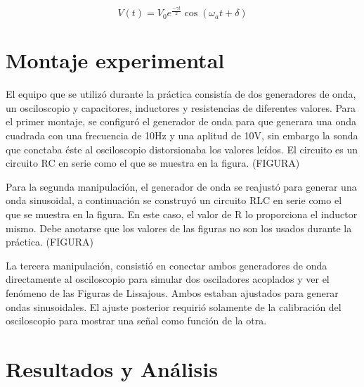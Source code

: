 \documentclass[%
 reprint,
 amsmath,amssymb,
 aps,
]{revtex4-1}
\begin{document}
\begin{equation}
V(t) = V_0 e^{\frac{-\gamma t}{2}}\cos(\omega_a t + \delta)
\end{equation}






\section{\label{sec:level1}Montaje experimental}
El equipo que se utiliz\'o durante la práctica consist\'ia de dos generadores de onda, un osciloscopio y capacitores, inductores y resistencias de diferentes valores. 
Para el primer montaje, se configur\'o el generador de onda para que generara una onda cuadrada con una frecuencia de 10Hz y una aplitud de 10V, sin embargo la sonda que conctaba \'este al osciloscopio distorsionaba los valores le\'idos. El circuito es un circuito RC en serie como el que se muestra en la figura. (FIGURA)


Para la segunda manipulaci\'on, el generador de onda se reajust\'o para generar una onda sinusoidal, a continuaci\'on se construy\'o un circuito RLC en serie como el que se muestra en la figura. En este caso, el valor de R lo proporciona el inductor mismo. Debe anotarse que los valores de las figuras no son los usados durante la pr\'actica. (FIGURA)

La tercera manipulaci\'on,  consisti\'o en conectar ambos generadores de onda directamente al osciloscopio para simular dos osciladores acoplados y ver el fen\'omeno de las Figuras de Lissajous. Ambos estaban ajustados para generar ondas sinusoidales. El ajuste posterior requiri\'o solamente de la calibraci\'on del osciloscopio para mostrar una señal como funci\'on de la otra. 


\section{\label{sec:level1}Resultados y An\'alisis}
\end{document}
